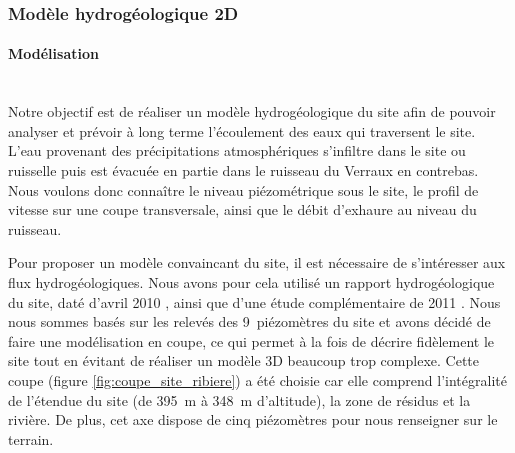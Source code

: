 \documentclass{article}
\begin{document}
\subsubsection{Modèle hydrogéologique 2D}
\paragraph{Modélisation \\ \\}
Notre objectif est de réaliser un modèle hydrogéologique du site afin de pouvoir analyser et prévoir à long terme l'écoulement des eaux qui traversent le site. L'eau provenant des précipitations atmosphériques s'infiltre dans le site ou ruisselle puis est évacuée en partie dans le ruisseau du Verraux en contrebas. Nous voulons donc connaître le niveau piézométrique sous le site, le profil de vitesse sur une coupe transversale, ainsi que le débit d'exhaure au niveau du ruisseau.

Pour proposer un modèle convaincant du site, il est nécessaire de s’intéresser aux flux hydrogéologiques. Nous avons pour cela utilisé un rapport hydrogéologique du site, daté d'avril 2010 \cite{societe_areva_nc_etude_2010}, ainsi que d'une étude complémentaire de 2011 \cite{societe_areva_nc_etude_2011}. Nous nous sommes basés sur les relevés des 9~piézomètres du site et avons décidé de faire une modélisation en coupe, ce qui permet à la fois de décrire fidèlement le site tout en évitant de réaliser un modèle 3D beaucoup trop complexe. Cette coupe (figure \ref{fig:coupe_site_ribiere}) a été choisie car elle comprend l'intégralité de l'étendue du site (de 395~m à 348~m d'altitude), la zone de résidus et la rivière. De plus, cet axe dispose de cinq piézomètres pour nous renseigner sur le terrain.


\end{document}
